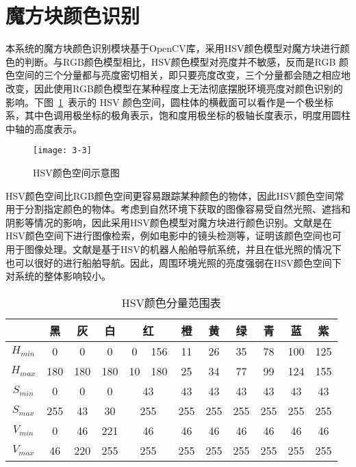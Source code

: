 \section{魔方块颜色识别}

本系统的魔方块颜色识别模块基于OpenCV库，采用HSV颜色模型对魔方块进行颜色的判断。与RGB颜色模型相比，HSV颜色模型对亮度并不敏感，反而是RGB 颜色空间的三个分量都与亮度密切相关，即只要亮度改变，三个分量都会随之相应地改变，因此使用RGB颜色模型在某种程度上无法彻底摆脱环境亮度对颜色识别的影响。下图~\ref{fig:3-3}~表示的 HSV 颜色空间，圆柱体的横截面可以看作是一个极坐标系，其中色调用极坐标的极角表示，饱和度用极坐标的极轴长度表示，明度用圆柱中轴的高度表示。

\begin{figure}[H]
	\centering
	\texttt{[image: 3-3]}
	\caption{HSV颜色空间示意图}\label{fig:3-3}
\end{figure}

HSV颜色空间比RGB颜色空间更容易跟踪某种颜色的物体，因此HSV颜色空间常用于分割指定颜色的物体。考虑到自然环境下获取的图像容易受自然光照、遮挡和阴影等情况的影响，因此采用HSV颜色模型对魔方块进行颜色识别。文献是在HSV颜色空间下进行图像检索，例如电影中的镜头检测等，证明该颜色空间也可用于图像处理。文献是基于HSV的机器人船舶导航系统，并且在低光照的情况下也可以很好的进行船舶导航。因此，周围环境光照的亮度强弱在HSV颜色空间下对系统的整体影响较小。

\begin{table}[H]
	\caption{HSV颜色分量范围表}\label{tab:3-3}
	\vspace{0.5em}
	\begin{center}
		{\wuhao
			\begin{tabular}{cccccccccccc}
				\toprule
				&黑&灰&白&\multicolumn{2}{c}{红}&橙&黄&绿&青&蓝&紫	\\
				\midrule
				$H_{min}$&0&0&0&0&156&11&26&35&78&100&125\\
				$H_{max}$&180&180&180&10&180&25&34&77&99&124&155\\
				$S_{min}$&0&0&0&\multicolumn{2}{c}{43}&43&43&43&43&43&43\\
				$S_{max}$&255&43&30&\multicolumn{2}{c}{255}&255&255&255&255&255&255\\
				$V_{min}$&0&46&221&\multicolumn{2}{c}{46}&46&46&46&46&46&46\\
				$V_{max}$&46&220&255&\multicolumn{2}{c}{255}&255&255&255&255&255&255\\
				\bottomrule
		\end{tabular}}
	\end{center}
	\vspace{-1.5em}
\end{table}

